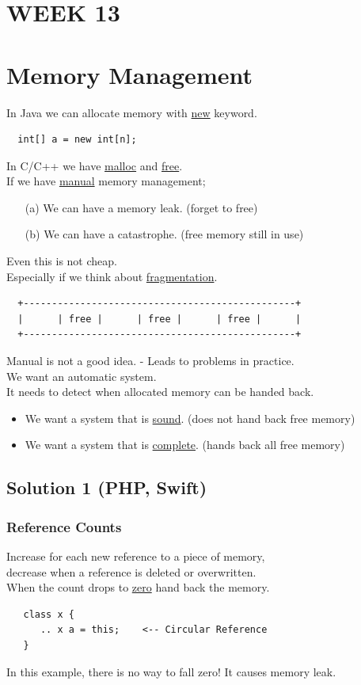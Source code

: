 \documentclass{article}
\begin{document}
\bigskip
\begin{flushleft}
 \section*{WEEK 13}
 \section*{Memory Management}
\begin{flushleft}
 In Java we can allocate memory with \underline{new} keyword.
 \begin{verbatim}
  int[] a = new int[n];
 \end{verbatim}
 In C/C++ we have \underline{malloc} and \underline{free}.\\
 \bigskip
 If we have \underline{manual} memory management;
 \begin{itemize}
  \item[(a)] We can have a memory leak. (forget to free)
  \item[(b)] We can have a catastrophe. (free memory still in use)
 \end{itemize}
 Even this is not cheap.\\
 Especially if we think about \underline{fragmentation}.
 \begin{verbatim}
  +------------------------------------------------+
  |      | free |      | free |      | free |      |
  +------------------------------------------------+
 \end{verbatim}
 Manual is not a good idea. - Leads to problems in practice.\\
 We want an automatic system.\\
 It needs to detect when allocated memory can be handed back.
 \begin{itemize}
  \item We want a system that is \underline{sound}. (does not hand back free memory)
  \item We want a system that is \underline{complete}. (hands back all free memory)
 \end{itemize}
\end{flushleft}

\subsection*{Solution 1 (PHP, Swift)}
\subsubsection*{Reference Counts}
 \begin{flushleft}
  Increase for each new reference to a piece of memory,\\
  decrease when a reference is deleted or overwritten.\\
  When the count drops to \underline{zero} hand back the memory.
  \begin{verbatim}
   class x {
      .. x a = this;    <-- Circular Reference
   }
  \end{verbatim}
  In this example, there is no way to fall zero! It causes memory leak.
 \end{flushleft}


\end{flushleft}
\end{document}
